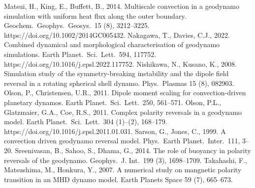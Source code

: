 \begin{thebibliography}{}
%
%
Matsui, H., King, E., Buffett, B., 2014. Multiscale convection in a geodynamo simulation with uniform heat flux along the outer boundary. Geochem.\ Geophys.\ Geosys.\ 15 (8), 3212--3225. https://doi.org/10.1002/2014GC005432.
%
%
{\color{red}
Nakagawa, T., Davies, C.J., 2022. Combined dynamical and morphological characterisation of geodynamo simulations. Earth Planet.\ Sci.\ Lett.\ 594, 117752. https://doi.org/10.1016/j.epsl.2022.117752.
}
%
Nishikawa, N., Kusano, K., 2008. Simulation study of the symmetry-breaking instability and the dipole field reversal in a rotating spherical shell dynamo. Phys.\ Plasmas 15 (8), 082903.
%
%
Olson, P., Christensen, U.R., 2011. Dipole moment scaling for convection-driven planetary dynamos. Earth Planet.\ Sci.\ Lett.\ 250, 561--571.
%
Olson, P.L., Glatzmaier, G.A., Coe, R.S., 2011. Complex polarity reversals in a geodynamo model. Earth Planet.\ Sci.\ Lett.\ 304 (1)--(2), 168--179. https://doi.org/10.1016/j.epsl.2011.01.031.
%
Sarson, G., Jones, C., 1999. A convection driven geodynamo reversal model. Phys.\ Earth Planet.\ Inter.\ 111, 3--20.
%
Sreenivasan, B., Sahoo, S., Dhama, G., 2014. The role of buoyancy in polarity reversals of the geodynamo. Geophys.\ J. Int.\ 199 (3), 1698--1709.
%
Takahashi, F., Matsushima, M., Honkura, Y., 2007. A numerical study on mangnetic polarity transition in an MHD dynamo model. Earth Planets Space 59 (7), 665--673.

\end{thebibliography}
